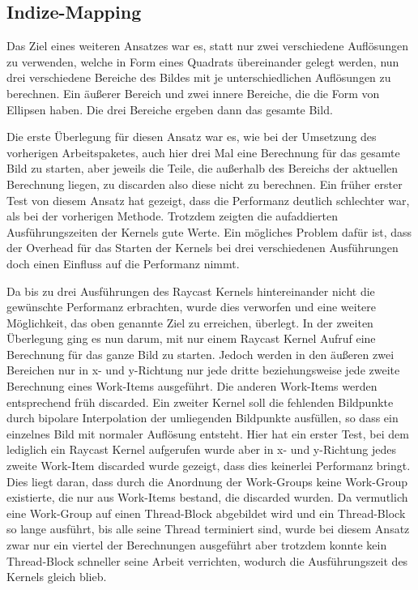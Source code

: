 \subsection*{Indize-Mapping}
Das Ziel eines weiteren Ansatzes war es, statt nur zwei verschiedene Auflösungen zu verwenden, welche in Form eines Quadrats übereinander gelegt werden, nun drei verschiedene Bereiche des Bildes mit je unterschiedlichen Auflösungen zu berechnen.
Ein äußerer Bereich und zwei innere Bereiche, die die Form von Ellipsen haben.
Die drei Bereiche ergeben dann das gesamte Bild.

Die erste Überlegung für diesen Ansatz war es, wie bei der Umsetzung des vorherigen Arbeitspaketes, auch hier drei Mal eine Berechnung für das gesamte Bild zu starten, aber jeweils die Teile, die außerhalb des Bereichs der aktuellen Berechnung liegen, zu discarden also diese nicht zu berechnen.
Ein früher erster Test von diesem Ansatz hat gezeigt, dass die Performanz deutlich schlechter war, als bei der vorherigen Methode.
Trotzdem zeigten die aufaddierten Ausführungszeiten der Kernels gute Werte.
Ein mögliches Problem dafür ist, dass der Overhead für das Starten der Kernels bei drei verschiedenen Ausführungen doch einen Einfluss auf die Performanz nimmt.

Da bis zu drei Ausführungen des Raycast Kernels hintereinander nicht die gewünschte Performanz erbrachten, wurde dies verworfen und eine weitere Möglichkeit, das oben genannte Ziel zu erreichen, überlegt.
In der zweiten Überlegung ging es nun darum, mit nur einem Raycast Kernel Aufruf eine Berechnung für das ganze Bild zu starten.
Jedoch werden in den äußeren zwei Bereichen nur in x- und y-Richtung nur jede dritte beziehungsweise jede zweite Berechnung eines Work-Items ausgeführt.
Die anderen Work-Items werden entsprechend früh discarded.
Ein zweiter Kernel soll die fehlenden Bildpunkte durch bipolare Interpolation der umliegenden Bildpunkte ausfüllen, so dass ein einzelnes Bild mit normaler Auflösung entsteht.
Hier hat ein erster Test, bei dem lediglich ein Raycast Kernel aufgerufen wurde aber in x- und y-Richtung jedes zweite Work-Item discarded wurde gezeigt, dass dies keinerlei Performanz bringt.
Dies liegt daran, dass durch die Anordnung der Work-Groups keine Work-Group existierte, die nur aus Work-Items bestand, die discarded wurden.
Da vermutlich eine Work-Group auf einen Thread-Block abgebildet wird und ein Thread-Block so lange ausführt, bis alle seine Thread terminiert sind, wurde bei diesem Ansatz zwar nur ein viertel der Berechnungen ausgeführt aber trotzdem konnte kein Thread-Block schneller seine Arbeit verrichten, wodurch die Ausführungszeit des Kernels gleich blieb.

